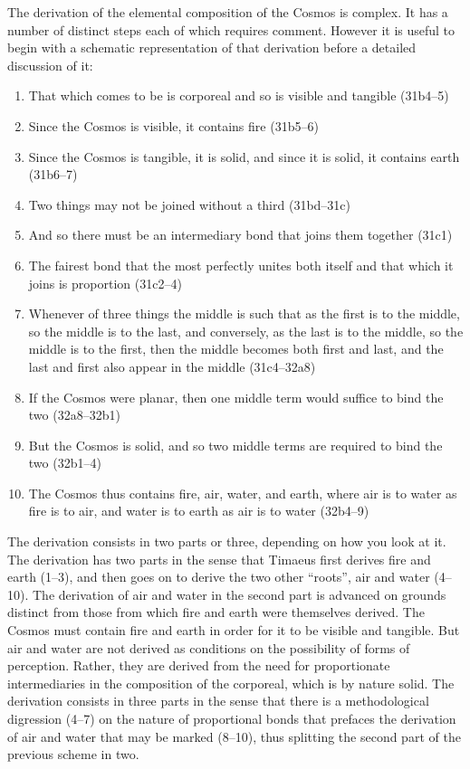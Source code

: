 The derivation of the elemental composition of the Cosmos is complex. It has a number of distinct steps each of which requires comment. However it is useful to begin with a schematic representation of that derivation before a detailed discussion of it:
\begin{enumerate}[(1)]
	\item That which comes to be is corporeal and so is visible and tangible (31b4--5)
	\item Since the Cosmos is visible, it contains fire (31b5--6)
	\item Since the Cosmos is tangible, it is solid, and since it is solid, it contains earth (31b6--7)
	\item Two things may not be joined without a third (31bd--31c)
	\item And so there must be an intermediary bond that joins them together (31c1)
	\item The fairest bond that the most perfectly unites both itself and that which it joins is proportion (31c2--4)
	\item Whenever of three things the middle is such that as the first is to the middle, so the middle is to the last, and conversely, as the last is to the middle, so the middle is to the first, then the middle becomes both first and last, and the last and first also appear in the middle (31c4--32a8)
	\item If the Cosmos were planar, then one middle term would suffice to bind the two (32a8--32b1)
	\item But the Cosmos is solid, and so two middle terms are required to bind the two (32b1--4)
	\item The Cosmos thus contains fire, air, water, and earth, where air is to water as fire is to air, and water is to earth as air is to water (32b4--9)
\end{enumerate}
The derivation consists in two parts or three, depending on how you look at it. The derivation has two parts in the sense that Timaeus first derives fire and earth (1--3), and then goes on to derive the two other ``roots'', air and water (4--10). The derivation of air and water in the second part is advanced on grounds distinct from those from which fire and earth were themselves derived. The Cosmos must contain fire and earth in order for it to be visible and tangible. But air and water are not derived as conditions on the possibility of forms of perception. Rather, they are derived from the need for proportionate intermediaries in the composition of the corporeal, which is by nature solid. The derivation consists in three parts in the sense that there is a methodological digression (4--7) on the nature of proportional bonds that prefaces the derivation of air and water that may be marked (8--10), thus splitting the second part of the previous scheme in two.

